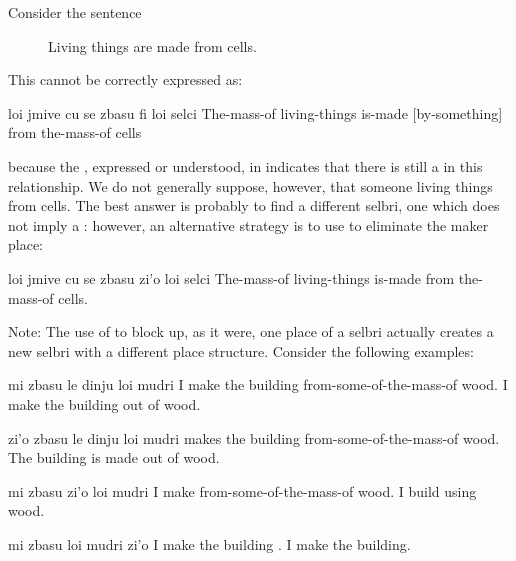 Consider the sentence 
\begin{description}
\item[] Living things are made from cells.

\end{description}

This cannot be correctly expressed as:
\begin{example}
loi jmive cu se zbasu  fi loi selci\n
The-mass-of living-things is-made [by-something]\n
\T	from the-mass-of cells
\end{example}

{\noindent}because the , expressed or understood, in  indicates that there is still a
     in this relationship. We do not generally suppose,
    however, that someone  living things from cells. The
    best answer is probably to find a different selbri, one which
    does not imply a : however, an alternative strategy is
    to use  to eliminate the maker place:
\begin{example}
loi jmive cu se zbasu zi'o\n
\T	loi selci\n
The-mass-of living-things is-made \n
\T	from the-mass-of cells.
\end{example}

Note: The use of  to block up, as it were, one place of
    a selbri actually creates a new selbri with a different place
    structure. Consider the following examples:
\begin{example}
mi zbasu le dinju loi mudri\n
I make the building from-some-of-the-mass-of wood.\n
I make the building out of wood.
\end{example}

\begin{example}
zi'o zbasu le dinju\n
\T	loi mudri\n
{} makes the building\n
\T	from-some-of-the-mass-of wood.\n
The building is made out of wood.
\end{example}

\begin{example}
mi zbasu zi'o\n
\T	loi mudri\n
I make \n
\T	from-some-of-the-mass-of wood.\n
I build using wood.
\end{example}

\begin{example}
mi zbasu loi mudri zi'o\n
I make the building .\n
I make the building.
\end{example}

